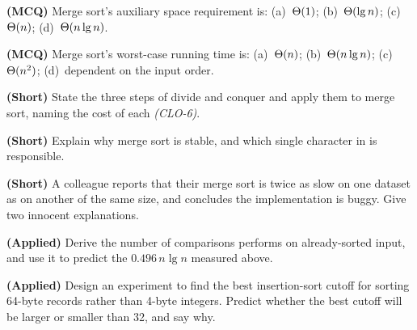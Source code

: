 \begin{reviewq}
  \item \textbf{(MCQ)} Merge sort's auxiliary space requirement is:
        (a)~$\Theta(1)$; (b)~$\Theta(\operatorname{lg} n)$; (c)~$\Theta(n)$;
        (d)~$\Theta(n\operatorname{lg} n)$.
  \item \textbf{(MCQ)} Merge sort's worst-case running time is:
        (a)~$\Theta(n)$; (b)~$\Theta(n\operatorname{lg} n)$; (c)~$\Theta(n^{2})$;
        (d)~dependent on the input order.
  \item \textbf{(Short)} State the three steps of divide and conquer and apply
        them to merge sort, naming the cost of each \emph{(CLO-6)}.
  \item \textbf{(Short)} Explain why merge sort is stable, and which single
        character in  is responsible.
  \item \textbf{(Short)} A colleague reports that their merge sort is twice as
        slow on one dataset as on another of the same size, and concludes the
        implementation is buggy. Give two innocent explanations.
  \item \textbf{(Applied)} Derive the number of comparisons 
        performs on already-sorted input, and use it to predict the
        $0.496\,n\lg n$ measured above.
  \item \textbf{(Applied)} Design an experiment to find the best insertion-sort
        cutoff for sorting 64-byte records rather than 4-byte integers. Predict
        whether the best cutoff will be larger or smaller than 32, and say why.
\end{reviewq}
